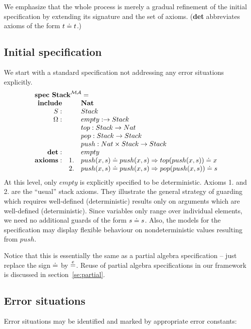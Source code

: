 \documentclass[10pt]{article}
\begin{document}
We emphasize that the whole
process is merely a gradual refinement of the initial specification by
extending its signature and the set of axioms. ({\bf det} abbreviates axioms
of the form $t\mathrel{\dot{=} } t$.)

\subsection{Initial specification}\label{subsub:pa1}
We start with a standard specification not addressing any
error situations explicitly.
\[ \spec{
	\tit{\mbox{\bf spec\ Stack}^{\inst{MA}}=} \\
		{\bf include}
			&& {\bf Nat}\\
		\Sorts: && Stack\\
		\Ops:   && empty: \to Stack\\
			&& top:Stack \to Nat\\
			&& pop:Stack \to Stack\\
			&& push:Nat \times Stack \to Stack\\
		{\bf det:} && empty \\
		{\bf axioms:}			
			&1.& push(x,s) \eleq push(x,s) \To top(push(x,s)) \eleq x\\
			&2.& push(x,s) \eleq push(x,s) \To pop(push(x,s)) \eleq s
}
\]
At this level, only $empty$ is explicitly specified to be
deterministic.  Axioms 1. and 2. are the ``usual'' stack axioms. They
illustrate the general strategy of
guarding which requires well-defined (deterministic) results only on
arguments which are well-defined (deterministic).
Since variables only range over individual elements, we need no
additional guards of the form $s\mathrel{\dot{=} } s$. Also, 
the models for the specification may display flexible behaviour on nondeterministic values
resulting from $push$. 

Notice
that this is essentially the same as a partial
algebra specification -- just replace the sign $\mathrel{\dot{=} }$ by $\stackrel{e}{=}$. 
Reuse of partial algebra specifications in our framework is
discussed in section~\ref{se:partial}.

\subsection{Error situations}\label{subsub:er2}
Error situations may be identified and marked by appropriate error constants:
\vspace*{1ex}
\end{document}
